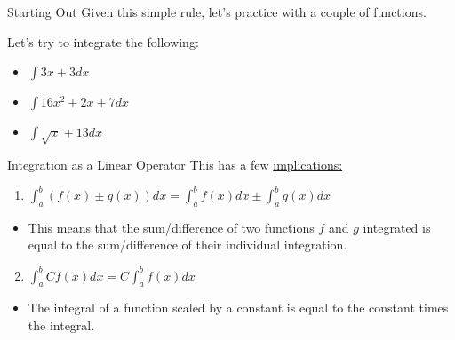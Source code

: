 \documentclass[
  ignorenonframetext,
]{beamer}
\providecommand{\tightlist}{%
  \setlength{\itemsep}{0pt}\setlength{\parskip}{0pt}}
\begin{document}
\begin{frame}{Starting Out}
\protect\hypertarget{starting-out}{}
Given this simple rule, let's practice with a couple of functions.

Let's try to integrate the following:

\begin{itemize}
\tightlist
\item
  \(\int 3x + 3 dx\)
\end{itemize}


\begin{itemize}
\tightlist
\item
  \(\int 16x^2 + 2x + 7 dx\)
\end{itemize}


\begin{itemize}
\tightlist
\item
  \(\int \sqrt{x} + 13 dx\)
\end{itemize}

\end{frame}

\begin{frame}{Integration as a Linear Operator}
\protect\hypertarget{integration-as-a-linear-operator}{}
This has a few
\href{https://math.mit.edu/~jorloff/suppnotes/suppnotes01-01a/01pi.pdf}{implications:}

\begin{enumerate}
\tightlist
\item
  \(\int^b_a (f(x)\pm g(x))dx = \int^b_a f(x)dx \pm \int^b_a g(x)dx\)
\end{enumerate}

\begin{itemize}[<+->]
\tightlist
\item
  This means that the sum/difference of two functions \(f\) and \(g\)
  integrated is equal to the sum/difference of their individual
  integration.
\end{itemize}

\begin{enumerate}
\setcounter{enumi}{1}
\tightlist
\item
  \(\int^b_a Cf(x)dx = C\int^b_a f(x)dx\)
\end{enumerate}

\begin{itemize}[<+->]
\tightlist
\item
  The integral of a function scaled by a constant is equal to the
  constant times the integral.
\end{itemize}
\end{frame}
\end{document}
